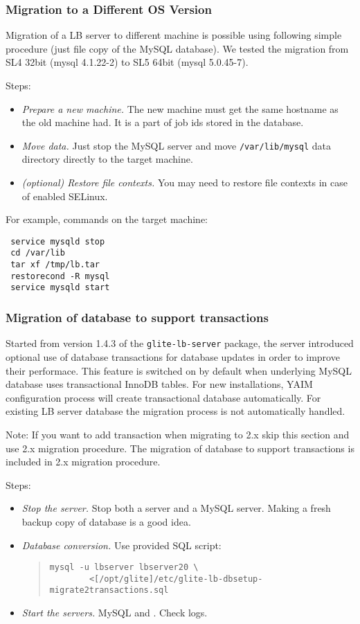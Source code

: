 \subsubsection{Migration to a Different OS Version}
\label{inst:OSmigration}
Migration of a LB server to different machine is possible using
following simple procedure (just file copy of the MySQL database). We
tested the migration from SL4 32bit (mysql 4.1.22-2) to SL5 64bit
(mysql 5.0.45-7).

Steps:
\begin{itemize}
\item \emph{Prepare a new machine.} The new machine must get the same hostname 
 as the old machine had. It is a part of job ids stored in the database.
\item \emph{Move data.} Just stop the MySQL server and move
 \verb'/var/lib/mysql' data directory directly to the target machine.
\item \emph{(optional) Restore file contexts.} You may need to restore file 
 contexts in case of enabled SELinux.
\end{itemize}
For example, commands on the target machine:
 \begin{verbatim}
 service mysqld stop
 cd /var/lib
 tar xf /tmp/lb.tar
 restorecond -R mysql
 service mysqld start
 \end{verbatim}

\subsubsection{Migration of database to support transactions}
Started from version 1.4.3 of the \texttt{glite-lb-server}
package, the \LB server introduced optional use of database
transactions for \LB database updates in order to improve their
performace. This feature is switched on by default when underlying
MySQL database uses transactional InnoDB tables. For new
installations, YAIM configuration process will create transactional
database automatically. For existing LB server database the migration 
process is not automatically handled.

Note: If you want to add transaction when migrating to \LB 2.x skip
this section and use \LB 2.x migration procedure. The migration of
database to support transactions is included in \LB 2.x migration procedure.

Steps:
\begin{itemize}
 \item \emph{Stop the server.} Stop both a \LB server and a MySQL
 server. Making a fresh backup copy of database is a good idea.
 \item \emph{Database conversion.} Use provided SQL script:
  \begin{quote}
   \begin{verbatim}
mysql -u lbserver lbserver20 \
        <[/opt/glite]/etc/glite-lb-dbsetup-migrate2transactions.sql
   \end{verbatim}
  \end{quote}
 \item \emph{Start the servers.} MySQL and \LB. Check logs.
\end{itemize}


